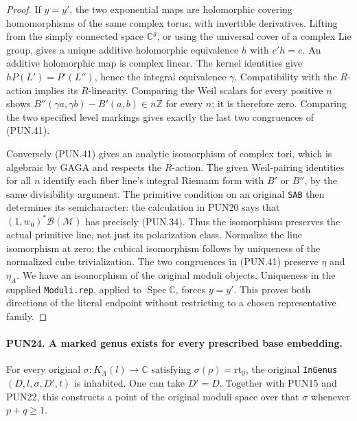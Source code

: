 \begin{proof}
If \(y=y'\), the two exponential maps are holomorphic covering
homomorphisms of the same complex torus, with invertible
derivatives.  Lifting from the simply connected space
\(\mathbb C^g\), or using the universal cover of a complex
Lie group, gives a unique additive holomorphic equivalence
\(h\) with \(e'h=e\).  An additive holomorphic map is
complex linear.  The kernel identities give
\(hP(L')=P'(L'')\), hence the integral equivalence
\(\gamma\).  Compatibility with the \(R\)-action implies
its \(R\)-linearity.  Comparing the Weil scalars for every
positive \(n\) shows
\(B''(\gamma a,\gamma b)-B'(a,b)\in n\mathbb Z\) for every
\(n\); it is therefore zero.  Comparing the two specified
level markings gives exactly the last two congruences of
(PUN.41).

Conversely (PUN.41) gives an analytic isomorphism of complex
tori, which is algebraic by GAGA and respects the \(R\)-action.
The given Weil-pairing identities for all \(n\) identify each
fiber line's integral Riemann form with \(B'\) or \(B''\),
by the same divisibility argument.  The primitive condition
on an original \texttt{SAB} then determines its semicharacter:
the calculation in PUN20 says that
\((1,w_0)^*\mathcal B(\mathcal M)\) has precisely (PUN.34).
Thus the isomorphism preserves the actual primitive line,
not just its polarization class.  Normalize the line
isomorphism at zero; the cubical isomorphism follows by
uniqueness of the normalized cube trivialization.  The two
congruences in (PUN.41) preserve \(\eta\) and \(\eta_A\).
We have an isomorphism of the original moduli objects.
Uniqueness in the supplied \texttt{Moduli.rep}, applied to
\(\operatorname{Spec}\mathbb C\), forces \(y=y'\).
This proves both directions of the literal endpoint without
restricting to a chosen representative family.
\end{proof}

\paragraph{PUN24. A marked genus exists for every prescribed base embedding.}
\label{claim:PUN24}
For every original \(\sigma:K_A(l)\to\mathbb C\) satisfying
\(\sigma(\rho)=\mathrm{rt}_0\), the original
\texttt{InGenus}\((D,l,\sigma,D',t)\) is inhabited.
One can take \(D'=D\).  Together with PUN15 and PUN22, this
constructs a point of the original moduli space over that
\(\sigma\) whenever \(p+q\ge1\).

